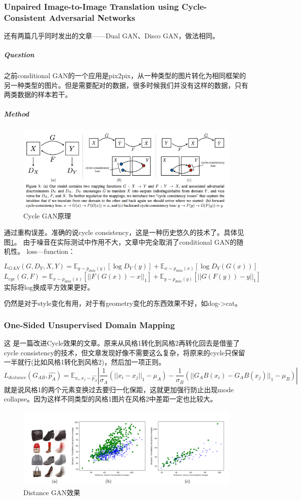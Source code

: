 \documentclass[a4paper]{article}
\begin{document}
\subsubsection{Unpaired Image-to-Image Translation using Cycle-Consistent Adversarial Networks\cite{DBLP:journals/corr/ZhuPIE17}}
还有两篇几乎同时发出的文章——Dual GAN、Disco GAN，做法相同。

\subparagraph{Question}
之前conditional GAN的一个应用是pix2pix，从一种类型的图片转化为相同框架的另一种类型的图片。但是需要配对的数据，很多时候我们并没有这样的数据，只有两类数据的样本若干。
\subparagraph{Method}
\begin{figure}
\centering
\includegraphics[width=\textwidth]{./img/18.png}
\caption{Cycle GAN原理}
\label{fig:18}
\end{figure}
通过重构误差。准确的说cycle consistency，这是一种历史悠久的技术了。具体见图\ref{fig:18}。
由于噪音在实际测试中作用不大，文章中完全取消了conditional GAN的随机性。
loss—function：

$$L_{GAN}(G,D_Y,X,Y)=\mathbb{E}_{y\sim p_{data}(y)}[\log D_Y(y)]+\mathbb{E}_{x\sim p_{data}(x)}[\log D_Y(G(x))]$$
$$L_{cyc}(G,F)=\mathbb{E}_{x\sim p_{data}(x)}[||F(G(x))-x||_1]+\mathbb{E}_{y\sim p_{data}(y)}[||G(F(y))-y||_1]$$
实际将log换成平方效果更好。

仍然是对于style变化有用，对于有geometry变化的东西效果不好，如dog->cat。
\subsubsection{One-Sided Unsupervised Domain Mapping\cite{DBLP:journals/corr/BenaimW17}}
这
是一篇改进Cycle效果的文章。原来从风格1转化到风格2再转化回去是借鉴了cycle consistency的技术，但文章发现好像不需要这么复杂，将原来的cycle只保留一半就行(比如风格1转化到风格2)，然后加一项正则。
$$L_{distance}(G_{AB},\hat{p_A})=\mathbb{E}_{x_i,x_j\sim \hat{p_A}}|\frac{1}{\sigma_A}(||x_i-x_j||_1-\mu_A)-\frac{1}{\sigma_B}(||G_AB(x_i)-G_AB(x_j)||_1-\mu_B)|$$
就是说风格1的两个元素变换过去要归一化保距，这就更加强行防止出现mode collapse。因为这样不同类型的风格1图片在风格2中差距一定也比较大。
\begin{figure}
\centering
\includegraphics[width=\textwidth]{./img/19.png}
\caption{Distance GAN效果}
\label{fig:19}
\end{figure}
\end{document}
